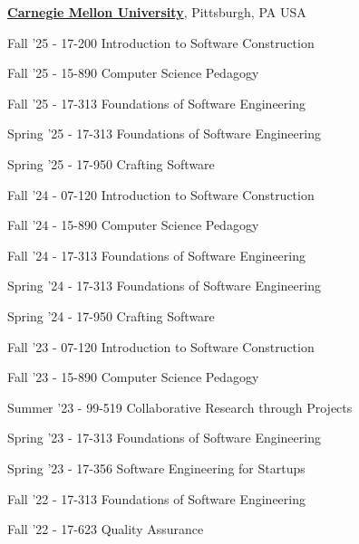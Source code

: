 \documentclass[10pt]{article}
\begin{document}
\begin{outerlist}
\item[] \href{https://www.cmu.edu/}{\textbf{Carnegie Mellon University}},
Pittsburgh, PA USA 
            \begin{innerlist}

 \item Fall '25 - 17-200 Introduction to Software Construction
 \item Fall '25 - 15-890 Computer Science Pedagogy
 \item Fall '25 - 17-313  Foundations of Software Engineering

 \item Spring '25 - 17-313  Foundations of Software Engineering
 \item Spring '25 - 17-950 Crafting Software

 \item Fall '24 - 07-120 Introduction to Software Construction
 \item Fall '24 - 15-890 Computer Science Pedagogy
 \item Fall '24 - 17-313  Foundations of Software Engineering

 \item Spring '24 - 17-313  Foundations of Software Engineering
 \item Spring '24 - 17-950 Crafting Software
  
  \item Fall '23 - 07-120 Introduction to Software Construction
  \item Fall '23 - 15-890 Computer Science Pedagogy
 
 \item Summer '23 - 	99-519 Collaborative Research through Projects
 
 \item Spring '23 - 17-313  Foundations of Software Engineering
 \item Spring '23 - 17-356 Software Engineering for Startups 
          
  \item Fall '22 - 17-313  Foundations of Software Engineering
  \item Fall '22 - 17-623  Quality Assurance


\end{innerlist}
\end{outerlist}
\end{document}
